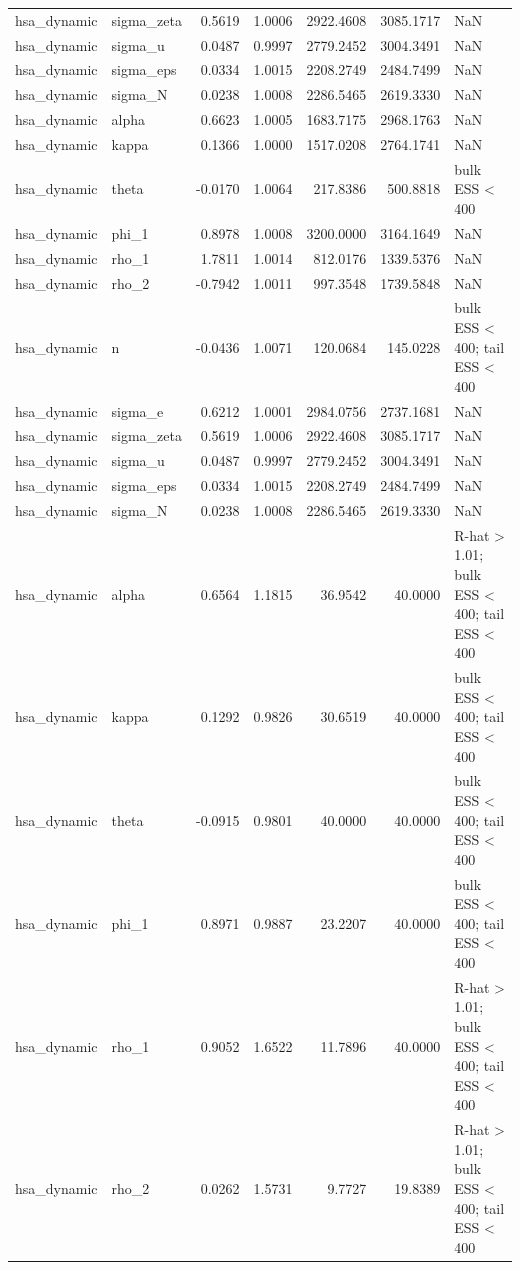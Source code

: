 \begin{tabular}{llrrrrl}
hsa\_dynamic & sigma\_zeta & 0.5619 & 1.0006 & 2922.4608 & 3085.1717 & NaN \\
hsa\_dynamic & sigma\_u & 0.0487 & 0.9997 & 2779.2452 & 3004.3491 & NaN \\
hsa\_dynamic & sigma\_eps & 0.0334 & 1.0015 & 2208.2749 & 2484.7499 & NaN \\
hsa\_dynamic & sigma\_N & 0.0238 & 1.0008 & 2286.5465 & 2619.3330 & NaN \\
hsa\_dynamic & alpha & 0.6623 & 1.0005 & 1683.7175 & 2968.1763 & NaN \\
hsa\_dynamic & kappa & 0.1366 & 1.0000 & 1517.0208 & 2764.1741 & NaN \\
hsa\_dynamic & theta & -0.0170 & 1.0064 & 217.8386 & 500.8818 & bulk ESS < 400 \\
hsa\_dynamic & phi\_1 & 0.8978 & 1.0008 & 3200.0000 & 3164.1649 & NaN \\
hsa\_dynamic & rho\_1 & 1.7811 & 1.0014 & 812.0176 & 1339.5376 & NaN \\
hsa\_dynamic & rho\_2 & -0.7942 & 1.0011 & 997.3548 & 1739.5848 & NaN \\
hsa\_dynamic & n & -0.0436 & 1.0071 & 120.0684 & 145.0228 & bulk ESS < 400; tail ESS < 400 \\
hsa\_dynamic & sigma\_e & 0.6212 & 1.0001 & 2984.0756 & 2737.1681 & NaN \\
hsa\_dynamic & sigma\_zeta & 0.5619 & 1.0006 & 2922.4608 & 3085.1717 & NaN \\
hsa\_dynamic & sigma\_u & 0.0487 & 0.9997 & 2779.2452 & 3004.3491 & NaN \\
hsa\_dynamic & sigma\_eps & 0.0334 & 1.0015 & 2208.2749 & 2484.7499 & NaN \\
hsa\_dynamic & sigma\_N & 0.0238 & 1.0008 & 2286.5465 & 2619.3330 & NaN \\
hsa\_dynamic & alpha & 0.6564 & 1.1815 & 36.9542 & 40.0000 & R-hat > 1.01; bulk ESS < 400; tail ESS < 400 \\
hsa\_dynamic & kappa & 0.1292 & 0.9826 & 30.6519 & 40.0000 & bulk ESS < 400; tail ESS < 400 \\
hsa\_dynamic & theta & -0.0915 & 0.9801 & 40.0000 & 40.0000 & bulk ESS < 400; tail ESS < 400 \\
hsa\_dynamic & phi\_1 & 0.8971 & 0.9887 & 23.2207 & 40.0000 & bulk ESS < 400; tail ESS < 400 \\
hsa\_dynamic & rho\_1 & 0.9052 & 1.6522 & 11.7896 & 40.0000 & R-hat > 1.01; bulk ESS < 400; tail ESS < 400 \\
hsa\_dynamic & rho\_2 & 0.0262 & 1.5731 & 9.7727 & 19.8389 & R-hat > 1.01; bulk ESS < 400; tail ESS < 400 \\

\end{tabular}
